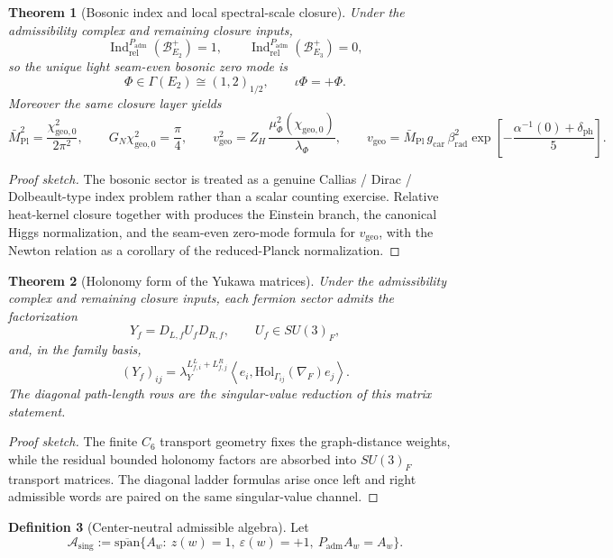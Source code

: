 \documentclass[11pt,a4paper]{article}
\newtheorem{theorem}{Theorem}[section]
\theoremstyle{definition}
\newtheorem{definition}[theorem]{Definition}
\theoremstyle{remark}
\DeclareMathOperator{\Ind}{Ind}
\newcommand{\inv}{\iota}
\newcommand{\Mpl}{\bar M_{\mathrm{Pl}}}
\newcommand{\Asing}{\mathcal A_{\mathrm{sing}}}
\newcommand{\lambdaY}{\lambda_Y}
\newcommand{\gcar}{g_{\mathrm{car}}}
\newcommand{\chigeozero}{\chi_{\mathrm{geo},0}}
\newcommand{\vgeo}{v_{\mathrm{geo}}}
\newcommand{\Padm}{P_{\mathrm{adm}}}
\begin{document}
\begin{theorem}[Bosonic index and local spectral-scale closure]
Under the admissibility complex and remaining closure inputs,
\[
\Ind_{\mathrm{rel}}^{\Padm}(\mathcal B_{E_2}^+)=1,
\qquad
\Ind_{\mathrm{rel}}^{\Padm}(\mathcal B_{E_3}^+)=0,
\]
so the unique light seam-even bosonic zero mode is
\[
\Phi\in\Gamma(E_2)\cong(1,2)_{1/2},
\qquad
\inv\Phi=+\Phi.
\]
Moreover the same closure layer yields
\[
\Mpl^2=\frac{\chigeozero^2}{2\pi^2},
\qquad
G_N\chigeozero^2=\frac{\pi}{4},
\qquad
\vgeo^2=Z_H\,\frac{\mu_\Phi^2(\chigeozero)}{\lambda_\Phi},
\qquad
\vgeo=\Mpl\,\gcar\,\beta_{\mathrm{rad}}^2
\exp\!\left[-\frac{\alpha^{-1}(0)+\delta_{\mathrm{ph}}}{5}\right].
\]
\end{theorem}

\begin{proof}[Proof sketch]
The bosonic sector is treated as a genuine Callias / Dirac / Dolbeault-type index problem rather than a scalar counting exercise. Relative heat-kernel closure together with  produces the Einstein branch, the canonical Higgs normalization, and the seam-even zero-mode formula for $\vgeo$, with the Newton relation as a corollary of the reduced-Planck normalization.
\end{proof}

\begin{theorem}[Holonomy form of the Yukawa matrices]
Under the admissibility complex and remaining closure inputs, each fermion sector admits the factorization
\[
Y_f=D_{L,f}U_fD_{R,f},
\qquad
U_f\in SU(3)_F,
\]
and, in the family basis,
\[
(Y_f)_{ij}
=
\lambdaY^{L^L_{f,i}+L^R_{f,j}}
\left\langle e_i,\mathrm{Hol}_{\Gamma_{ij}}(\nabla_F)e_j\right\rangle.
\]
The diagonal path-length rows  are the singular-value reduction of this matrix statement.
\end{theorem}

\begin{proof}[Proof sketch]
The finite $C_6$ transport geometry fixes the graph-distance weights, while the residual bounded holonomy factors are absorbed into $SU(3)_F$ transport matrices. The diagonal ladder formulas arise once left and right admissible words are paired on the same singular-value channel.
\end{proof}

\begin{definition}[Center-neutral admissible algebra]
Let
\[
\Asing
:=
\overline{\mathrm{span}}\{A_w:\ z(w)=1,\ \varepsilon(w)=+1,\ \Padm A_w=A_w\}.
\]
\end{definition}
\end{document}
